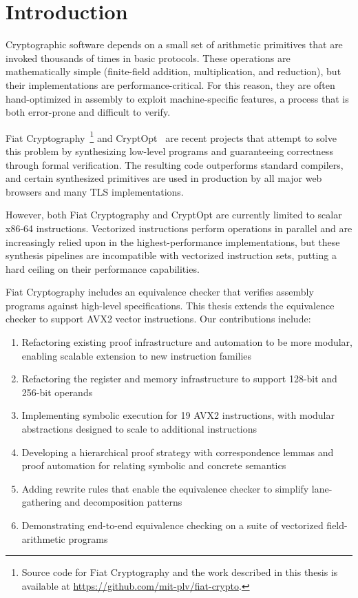 
\chapter{Introduction}
\label{ch:intro}

Cryptographic software depends on a small set of arithmetic primitives that are invoked thousands of times in basic protocols. These operations are mathematically simple (finite-field addition, multiplication, and reduction), but their implementations are performance-critical. For this reason, they are often hand-optimized in assembly to exploit machine-specific features, a process that is both error-prone and difficult to verify. 

Fiat Cryptography~\autocite{fiatcrypto2019}\footnote{Source code for Fiat Cryptography and the work described in this thesis is available at \url{https://github.com/mit-plv/fiat-crypto}.} and CryptOpt~\autocite{cryptopt2023} are recent projects that attempt to solve this problem by synthesizing low-level programs and guaranteeing correctness through formal verification.
The resulting code outperforms standard compilers, and certain synthesized primitives are used in production by all major web browsers and many TLS implementations.

However, both Fiat Cryptography and CryptOpt are currently limited to scalar x86-64 instructions. Vectorized instructions perform operations in parallel and are increasingly relied upon in the highest-performance implementations, but these synthesis pipelines are incompatible with vectorized instruction sets, putting a hard ceiling on their performance capabilities.

Fiat Cryptography includes an equivalence checker that verifies assembly programs against high-level specifications.
This thesis extends the equivalence checker to support AVX2 vector instructions.
Our contributions include:
\begin{enumerate}
    \item Refactoring existing proof infrastructure and automation to be more modular, enabling scalable extension to new instruction families
    \item Refactoring the register and memory infrastructure to support 128-bit and 256-bit operands
    \item Implementing symbolic execution for 19 AVX2 instructions, with modular abstractions designed to scale to additional instructions
    \item Developing a hierarchical proof strategy with correspondence lemmas and proof automation for relating symbolic and concrete semantics
    \item Adding rewrite rules that enable the equivalence checker to simplify lane-gathering and decomposition patterns
\item Demonstrating end-to-end equivalence checking on a suite of vectorized field-arithmetic programs
\end{enumerate}


